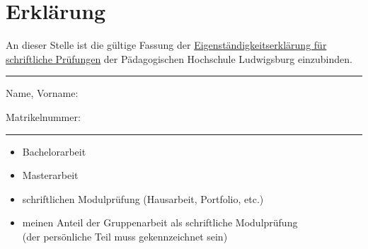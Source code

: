 \documentclass[oneside,12pt,a4paper]{scrreprt} %
\begin{document}

\newpage

\tableofcontents\label{toc}
\cleardoublepage


\cleardoublepage


\cleardoublepage


\cleardoublepage


\cleardoublepage


\cleardoublepage



\cleardoublepage

\thispagestyle{empty}
\section*{Erklärung}
An dieser Stelle ist die gültige Fassung der \href{https://media.ph-ludwigsburg.de/downloadzentrum/objekte/1410173-Eigenstndigkeitserklrung-fr-schriftliche-Prfungen
}{Eigenständigkeitserklärung für schriftliche Prüfungen} der Pädagogischen Hochschule Ludwigsburg einzubinden.
\hrule

\noindent


\noindent
Name, Vorname:

\noindent
Matrikelnummer: 
\vspace{0.1cm}
\hrule
\vspace{0.5cm}

\noindent
\begin{itemize}[label=$\square$, leftmargin=*, nosep]
    \item Bachelorarbeit
    \item Masterarbeit
    \item schriftlichen Modulprüfung (Hausarbeit, Portfolio, etc.)
    \item meinen Anteil der Gruppenarbeit als schriftliche Modulprüfung\\
    (der persönliche Teil muss gekennzeichnet sein)
\end{itemize}
\end{document}
